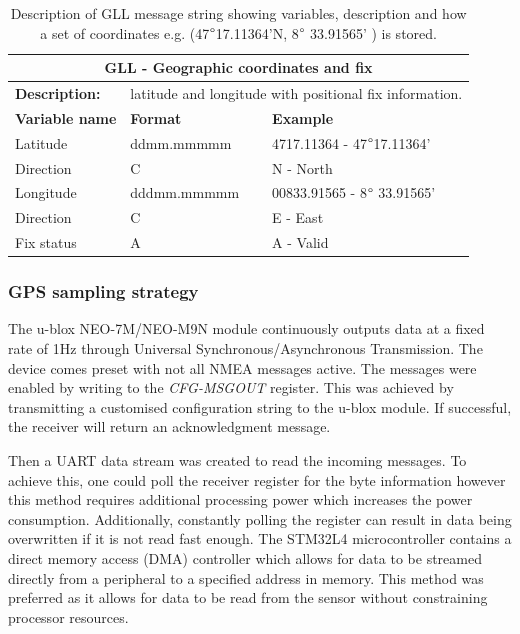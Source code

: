 \begin{table}[H]
	\centering
	\caption{Description of GLL message string showing variables, description and how a set of coordinates e.g. (47$\degree$17.11364'N,  8$\degree$ 33.91565' ) is stored.}
	\setlength{\extrarowheight}{5pt}
	\begin{tabular}{lll}
		\hline
		\hline
		\multicolumn{3}{c}{\textbf{GLL - Geographic coordinates and fix}}\\
		\hline
		\textbf{Description:} & \multicolumn{2}{l}{ latitude and longitude with positional fix information.}\\
		\hline
		\hline
		\textbf{Variable name} & \textbf{Format}& \textbf{Example} \\
		\hline
		Latitude & ddmm.mmmmm & 4717.11364 - 47$\degree$17.11364'\\
		\hline
		Direction  & C & N - North \\
		\hline
		Longitude &dddmm.mmmmm & 00833.91565 - 8$\degree$ 33.91565' \\
		\hline
		Direction & C & E - East \\
		\hline
		Fix status & A & A - Valid\\
		\hline
		\hline
	\end{tabular}
	
	\label{tab:NMEA_GLL}
\end{table}

\subsubsection{GPS sampling strategy}
\label{subsec:CH5_gpsss}
The u-blox NEO-7M/NEO-M9N module continuously outputs data at a fixed rate of 1Hz \cite{UBLOX_M9N_INTERFACE} through Universal Synchronous/Asynchronous Transmission. The device comes preset with not all NMEA messages active. The messages were enabled by writing to the \textit{CFG-MSGOUT} register. This was achieved by transmitting a customised configuration string to the u-blox module. If successful, the receiver will return an acknowledgment message.\par 

Then a UART data stream was created to read the incoming messages. To achieve this, one could poll the receiver register for the byte information however this method requires additional processing power which increases the power consumption. Additionally, constantly polling the register can result in data being overwritten if it is not read fast enough. The STM32L4 microcontroller contains a direct memory access (DMA) controller \cite{stm32l4ref} which allows for data to be streamed directly from a peripheral to a specified address in memory. This method was preferred as it allows for data to be read from the sensor without constraining processor resources. \par 

